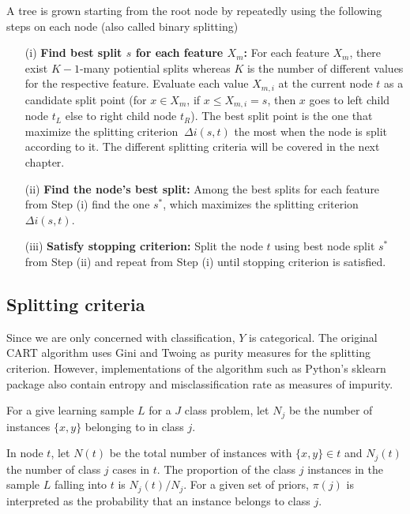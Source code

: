 A tree is grown starting from the root node by repeatedly using the following steps on each
node (also called binary splitting)

\begin{itemize}
    \item[(i)] \textbf{Find best split \(s\) for each feature \(X_{m}\):}
    For each feature \(X_{m}\), there exist \(K-1\)-many potiential splits whereas \(K\) is the number of different values for the respective feature.
    Evaluate each value \(X_{m,i}\) at the current node \(t\) as a candidate split point (for \(x \in X_{m}\), if \(x \leq X_{m,i}=s\),
    then \(x\) goes to left child node \(t_{L}\) else to right child node \(t_{R}\)).
    The best split point is the one that maximize the splitting criterion \(\ \Delta i(s,t) \) the most when the node is split according to it.
    The different splitting criteria will be covered in the next chapter.
    \item[(ii)] \textbf{Find the node’s best split:} Among the best splits for each feature from Step (i) find the one \(s^{*}\), which maximizes the splitting criterion \(\Delta i(s,t)\).
    \item[(iii)] \textbf{Satisfy stopping criterion:} Split the node \(t\) using best node split \(s^{*}\) from Step (ii) and 
    repeat from Step (i) until stopping criterion is satisfied. 
\end{itemize}

\subsection{Splitting criteria}
Since we are only concerned with classification, \(Y\) is categorical. The original CART algorithm uses Gini and Twoing as 
purity measures for the splitting criterion. However, implementations of the algorithm such as Python's sklearn package
also contain entropy and misclassification rate as measures of impurity.

For a give learning sample \(L\) for a \(J\) class problem, let \(N_{j}\) be the number of instances \( \{x,y\}  \)
belonging to in class \(j\).

In node \(t\), let \(N(t)\) be the total number of instances with \( \{x,y\} \in t \) and \( N_{j}(t) \) the number of class \(j\)
cases in \(t\). The proportion of the class \(j\) instances in the sample \(L\) falling into \(t\) is  \( N_{j}(t) / N_{j} \).
For a given set of priors, \( \pi(j) \) is interpreted as the probability that an instance belongs to class \(j\).

